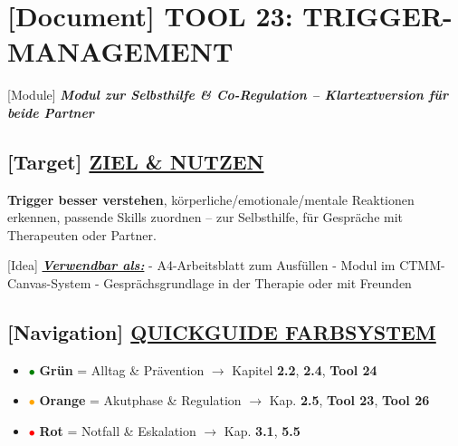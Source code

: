 \hypertarget{tool-23-trigger-management}{%
\section{\texorpdfstring{[Document] \textbf{TOOL 23: TRIGGER-MANAGEMENT}}{[Document] TOOL 23: TRIGGER-MANAGEMENT}}\label{tool-23-trigger-management}}

[Module] \emph{\textbf{Modul zur Selbsthilfe \& Co-Regulation -- Klartextversion für beide Partner}}

\hypertarget{ziel-nutzen}{%
\subsection{\texorpdfstring{[Target] \textbf{\ul{ZIEL \& NUTZEN}}}{[Target] ZIEL \& NUTZEN}}\label{ziel-nutzen}}

\textbf{Trigger besser verstehen}, körperliche/emotionale/mentale Reaktionen erkennen, passende Skills zuordnen -- zur Selbsthilfe, für Gespräche mit Therapeuten oder Partner.

[Idea] \emph{\textbf{\ul{Verwendbar als:}}} - A4-Arbeitsblatt zum Ausfüllen - Modul im CTMM-Canvas-System - Gesprächsgrundlage in der Therapie oder mit Freunden

\hypertarget{section}{%
\subsection{}\label{section}}

\hypertarget{quickguide-farbsystem}{%
\subsection{\texorpdfstring{[Navigation] \textbf{\ul{QUICKGUIDE FARBSYSTEM}}}{[Navigation] QUICKGUIDE FARBSYSTEM}}\label{quickguide-farbsystem}}

\begin{itemize}
\tightlist
\item
  \textcolor{green}{$\bullet$} \textbf{Grün} = Alltag \& Prävention $\rightarrow$ Kapitel \textbf{2.2}, \textbf{2.4}, \textbf{Tool 24}
\item
  \textcolor{orange}{$\bullet$} \textbf{Orange} = Akutphase \& Regulation $\rightarrow$ Kap. \textbf{2.5}, \textbf{Tool 23}, \textbf{Tool 26}
\item
  \textcolor{red}{$\bullet$} \textbf{Rot} = Notfall \& Eskalation $\rightarrow$ Kap. \textbf{3.1}, \textbf{5.5}
\end{itemize}

